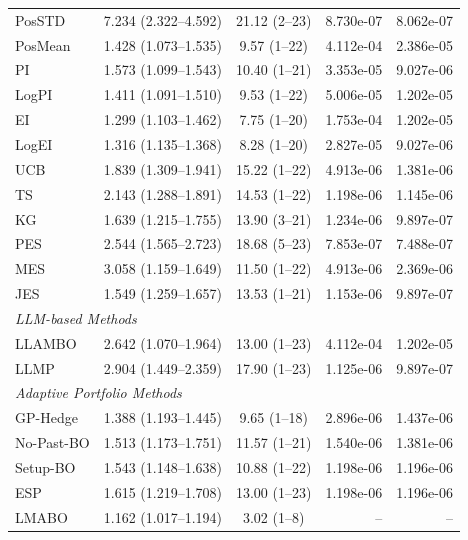 \begin{table}
\begin{tabular}{@{}lccrr@{}}
    PosSTD & 7.234 (2.322--4.592) & 21.12 (2--23) & 8.730e-07 & 8.062e-07 \\
PosMean & 1.428 (1.073--1.535) & 9.57 (1--22) & 4.112e-04 & 2.386e-05 \\
PI & 1.573 (1.099--1.543) & 10.40 (1--21) & 3.353e-05 & 9.027e-06 \\
LogPI & 1.411 (1.091--1.510) & 9.53 (1--22) & 5.006e-05 & 1.202e-05 \\
EI & 1.299 (1.103--1.462) & 7.75 (1--20) & 1.753e-04 & 1.202e-05 \\
LogEI & 1.316 (1.135--1.368) & 8.28 (1--20) & 2.827e-05 & 9.027e-06 \\
UCB & 1.839 (1.309--1.941) & 15.22 (1--22) & 4.913e-06 & 1.381e-06 \\
TS & 2.143 (1.288--1.891) & 14.53 (1--22) & 1.198e-06 & 1.145e-06 \\
KG & 1.639 (1.215--1.755) & 13.90 (3--21) & 1.234e-06 & 9.897e-07 \\
PES & 2.544 (1.565--2.723) & 18.68 (5--23) & 7.853e-07 & 7.488e-07 \\
MES & 3.058 (1.159--1.649) & 11.50 (1--22) & 4.913e-06 & 2.369e-06 \\
JES & 1.549 (1.259--1.657) & 13.53 (1--21) & 1.153e-06 & 9.897e-07 \\
\multicolumn{4}{l}{\textit{LLM-based Methods}} \\
LLAMBO & 2.642 (1.070--1.964) & 13.00 (1--23) & 4.112e-04 & 1.202e-05 \\
LLMP & 2.904 (1.449--2.359) & 17.90 (1--23) & 1.125e-06 & 9.897e-07 \\
\multicolumn{4}{l}{\textit{Adaptive Portfolio Methods}} \\
GP-Hedge & 1.388 (1.193--1.445) & 9.65 (1--18) & 2.896e-06 & 1.437e-06 \\
No-Past-BO & 1.513 (1.173--1.751) & 11.57 (1--21) & 1.540e-06 & 1.381e-06 \\
Setup-BO & 1.543 (1.148--1.638) & 10.88 (1--22) & 1.198e-06 & 1.196e-06 \\
ESP & 1.615 (1.219--1.708) & 13.00 (1--23) & 1.198e-06 & 1.196e-06 \\
\midrule
LMABO & 1.162 (1.017--1.194) & 3.02 (1--8) & -- & -- \\
\bottomrule
    \end{tabular}
    \end{table}
    
